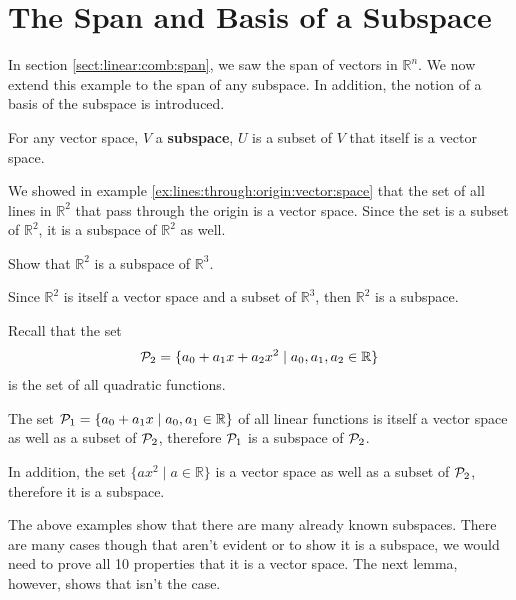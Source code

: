 \section{The Span and Basis of a Subspace}

In section \ref{sect:linear:comb:span}, we saw the span of vectors in $\mathbb{R}^n$.  We now extend this example to the span of any subspace.  In addition, the notion of a basis  of the subspace is introduced.  

\begin{definition}
For any vector space, $V$ a \textbf{subspace}, $U$ is a subset of $V$ that itself is a vector space.  
\end{definition}

\begin{example}
We showed in example \ref{ex:lines:through:origin:vector:space} that the set of all lines in $\mathbb{R}^2$ that pass through the origin is a vector space.  Since the set is a subset of $\mathbb{R}^2$, it is a subspace of $\mathbb{R}^2$ as well. 
\end{example}


\begin{example}
Show that $\mathbb{R}^2$ is a subspace of $\mathbb{R}^3$.  

\solution

Since $\mathbb{R}^2$ is itself a vector space and a subset of $\mathbb{R}^3$, then $\mathbb{R}^2$ is a subspace. 
\end{example}



\begin{example}
Recall that the set
  \begin{align*}
{\cal P}_2=\{ a_0 + a_1 x + a_2 x^2\; | \; a_0, a_1, a_2 \in \mathbb{R} \}
 \end{align*}
is the set of all quadratic functions.  

The set ${\cal P}_1 = \{a_0 + a_1 x \; | \; a_0, a_1 \in \mathbb{R} \}$ of all linear functions is itself a vector space as well as a subset of ${\cal P}_2$, therefore ${\cal P}_1$ is a subspace of ${\cal P}_2$.

In addition, the set $\{ a x^2\; | \; a \in \mathbb{R}\}$ is a vector space as well as a subset of ${\cal P}_2$, therefore it is a subspace.  
\end{example}

The above examples show that there are many already known subspaces.  There are many cases though that aren't evident or to show it is a subspace, we would need to prove all 10 properties that it is a vector space.  The next lemma, however, shows that isn't the case.  

